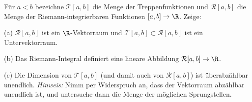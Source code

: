 \begin{prob} 
F\"ur $a<b$ bezeichne $\mathcal{T}[a,b]$ die Menge der Treppenfunktionen und $\mathcal{R}[a,b]$ die Menge der Riemann-integrierbaren Funktionen $[a,b]\to\R$. Zeige:

(a) $\mathcal{R}[a,b]$ ist ein $\R$-Vektorraum und $\mathcal{T}[a,b]\subset\mathcal{R}[a,b]$ ist ein Untervektorraum. 

(b) Das Riemann-Integral definiert eine lineare Abbildung $\mathcal{R}[a,b]\to\R$.

(c) Die Dimension von $\mathcal{T}[a,b]$ (und damit auch von $\mathcal{R}[a,b]$) ist \"uberabz\"ahlbar unendlich. 
\textit{Hinweis:}  Nimm per Widerspruch an, dass der Vektorraum abzählbar unendlich ist, und untersuche dann die Menge der möglichen Sprungstellen.
\end{prob}
